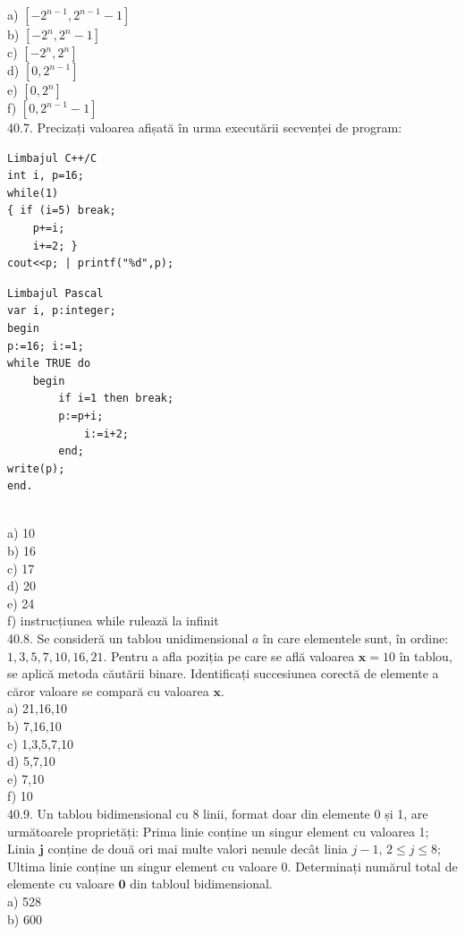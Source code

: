 \begin{itemize}
\begin{enumerate}
a) $\left[-2^{n-1}, 2^{n-1}-1\right]$
\\
b) $\left[-2^{n}, 2^{n}-1\right]$
\\
c) $\left[-2^{n}, 2^{n}\right]$
\\
d) $\left[0,2^{n-1}\right]$
\\
e) $\left[0,2^{n}\right]$
\\
f) $\left[0,2^{n-1}-1\right]$
\\
40.7. Precizați valoarea afișată în urma executării secvenței de program:
\begin{verbatim}
Limbajul C++/C
int i, p=16;
while(1)
{ if (i=5) break;
    p+=i;
    i+=2; }
cout<<p; | printf("%d",p);
\end{verbatim}
\begin{verbatim}
Limbajul Pascal
var i, p:integer;
begin
p:=16; i:=1;
while TRUE do
    begin
        if i=1 then break;
        p:=p+i;
            i:=i+2;
        end;
write(p);
end.
\end{verbatim}
\\
a) 10
\\
b) 16
\\
c) 17
\\
d) 20
\\
e) 24
\\
f) instrucțiunea while rulează la infinit
\\
40.8. Se consideră un tablou unidimensional $a$ în care elementele sunt, în ordine: $1,3,5,7,10,16,21$. Pentru a afla poziția pe care se află valoarea $\mathbf{x}=10$ în tablou, se aplică metoda căutării binare. Identificați succesiunea corectă de elemente a căror valoare se compară cu valoarea $\mathbf{x}$.
\\
a) 21,16,10
\\
b) 7,16,10
\\
c) 1,3,5,7,10
\\
d) 5,7,10
\\
e) 7,10
\\
f) 10
\\
40.9. Un tablou bidimensional cu 8 linii, format doar din elemente 0 și 1, are următoarele proprietăți:
Prima linie conține un singur element cu valoarea 1;
Linia $\mathbf{j}$ conține de două ori mai multe valori nenule decât linia $j-1$, $2 \leq j \leq 8$; Ultima linie conține un singur element cu valoare 0.
Determinați numărul total de elemente cu valoare $\mathbf{0}$ din tabloul bidimensional.
\\
a) 528
\\
b) 600
\\

\end{enumerate}
\end{itemize}
